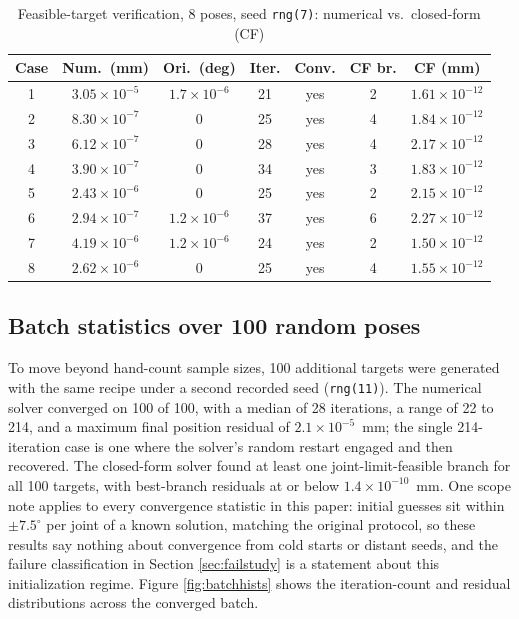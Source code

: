 \documentclass[conference]{IEEEtran}
\begin{document}
\begin{table}[t]
\caption{Feasible-target verification, 8 poses, seed \texttt{rng(7)}: numerical vs.\ closed-form (CF)}
\label{tab:ikresults}
\centering
\scriptsize
\setlength{\tabcolsep}{2pt}
\begin{tabular}{ccccccc}
\hline
Case & Num.\ (mm) & Ori.\ (deg) & Iter. & Conv. & CF br. & CF (mm) \\
\hline
1 & $3.05\times10^{-5}$ & $1.7\times10^{-6}$ & 21 & yes & 2 & $1.61\times10^{-12}$ \\
2 & $8.30\times10^{-7}$ & 0 & 25 & yes & 4 & $1.84\times10^{-12}$ \\
3 & $6.12\times10^{-7}$ & 0 & 28 & yes & 4 & $2.17\times10^{-12}$ \\
4 & $3.90\times10^{-7}$ & 0 & 34 & yes & 3 & $1.83\times10^{-12}$ \\
5 & $2.43\times10^{-6}$ & 0 & 25 & yes & 2 & $2.15\times10^{-12}$ \\
6 & $2.94\times10^{-7}$ & $1.2\times10^{-6}$ & 37 & yes & 6 & $2.27\times10^{-12}$ \\
7 & $4.19\times10^{-6}$ & $1.2\times10^{-6}$ & 24 & yes & 2 & $1.50\times10^{-12}$ \\
8 & $2.62\times10^{-6}$ & 0 & 25 & yes & 4 & $1.55\times10^{-12}$ \\
\hline
\end{tabular}
\end{table}

\subsection{Batch statistics over 100 random poses}
\label{sec:batch}
To move beyond hand-count sample sizes, 100 additional targets were generated with the same recipe under a second recorded seed (\texttt{rng(11)}). The numerical solver converged on 100 of 100, with a median of 28 iterations, a range of 22 to 214, and a maximum final position residual of $2.1\times10^{-5}$~mm; the single 214-iteration case is one where the solver's random restart engaged and then recovered. The closed-form solver found at least one joint-limit-feasible branch for all 100 targets, with best-branch residuals at or below $1.4\times10^{-10}$~mm. One scope note applies to every convergence statistic in this paper: initial guesses sit within $\pm7.5^\circ$ per joint of a known solution, matching the original protocol, so these results say nothing about convergence from cold starts or distant seeds, and the failure classification in Section \ref{sec:failstudy} is a statement about this initialization regime. Figure \ref{fig:batchhists} shows the iteration-count and residual distributions across the converged batch.
\end{document}
